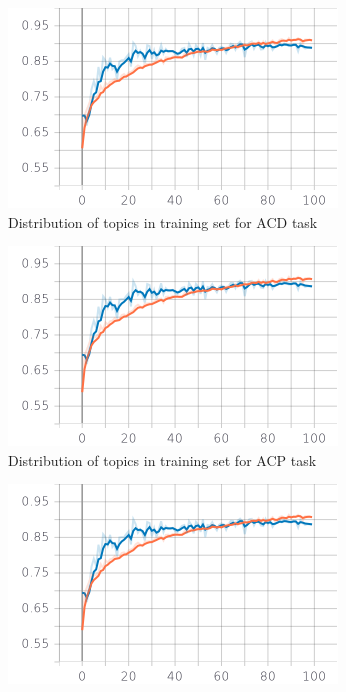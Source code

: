 \documentclass{article}
\begin{document}
            \begin{figure}
		    \centering
		        \begin{subfigure}{.33\textwidth}
  		            \centering
 		            \includegraphics[width=\textwidth]{w2v_acp_epoch_accuracy.png}
  		            \caption{Distribution of topics in training set for ACD task}
  		            \label{acd_y_train_historgram1}
		        \end{subfigure}%
                \begin{subfigure}{.33\textwidth}
 		            \centering
 		            \includegraphics[width=\textwidth]{w2v_acp_epoch_recall.png}
 		            \caption{Distribution of topics in training set for ACP task}
 		            \label{acp_y_train_historgram2}
		        \end{subfigure}
                \begin{subfigure}{.33\textwidth}
 		            \centering
 		            \includegraphics[width=\textwidth]{w2v_acp_epoch_recall.png}

\end{subfigure}
\end{figure}
\end{document}
